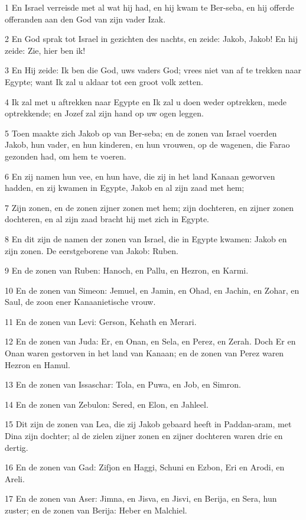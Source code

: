 \par 1 En Israel verreisde met al wat hij had, en hij kwam te Ber-seba, en hij offerde offeranden aan den God van zijn vader Izak.
\par 2 En God sprak tot Israel in gezichten des nachts, en zeide: Jakob, Jakob! En hij zeide: Zie, hier ben ik!
\par 3 En Hij zeide: Ik ben die God, uws vaders God; vrees niet van af te trekken naar Egypte; want Ik zal u aldaar tot een groot volk zetten.
\par 4 Ik zal met u aftrekken naar Egypte en Ik zal u doen weder optrekken, mede optrekkende; en Jozef zal zijn hand op uw ogen leggen.
\par 5 Toen maakte zich Jakob op van Ber-seba; en de zonen van Israel voerden Jakob, hun vader, en hun kinderen, en hun vrouwen, op de wagenen, die Farao gezonden had, om hem te voeren.
\par 6 En zij namen hun vee, en hun have, die zij in het land Kanaan geworven hadden, en zij kwamen in Egypte, Jakob en al zijn zaad met hem;
\par 7 Zijn zonen, en de zonen zijner zonen met hem; zijn dochteren, en zijner zonen dochteren, en al zijn zaad bracht hij met zich in Egypte.
\par 8 En dit zijn de namen der zonen van Israel, die in Egypte kwamen: Jakob en zijn zonen. De eerstgeborene van Jakob: Ruben.
\par 9 En de zonen van Ruben: Hanoch, en Pallu, en Hezron, en Karmi.
\par 10 En de zonen van Simeon: Jemuel, en Jamin, en Ohad, en Jachin, en Zohar, en Saul, de zoon ener Kanaanietische vrouw.
\par 11 En de zonen van Levi: Gerson, Kehath en Merari.
\par 12 En de zonen van Juda: Er, en Onan, en Sela, en Perez, en Zerah. Doch Er en Onan waren gestorven in het land van Kanaan; en de zonen van Perez waren Hezron en Hamul.
\par 13 En de zonen van Issaschar: Tola, en Puwa, en Job, en Simron.
\par 14 En de zonen van Zebulon: Sered, en Elon, en Jahleel.
\par 15 Dit zijn de zonen van Lea, die zij Jakob gebaard heeft in Paddan-aram, met Dina zijn dochter; al de zielen zijner zonen en zijner dochteren waren drie en dertig.
\par 16 En de zonen van Gad: Zifjon en Haggi, Schuni en Ezbon, Eri en Arodi, en Areli.
\par 17 En de zonen van Aser: Jimna, en Jisva, en Jisvi, en Berija, en Sera, hun zuster; en de zonen van Berija: Heber en Malchiel.
